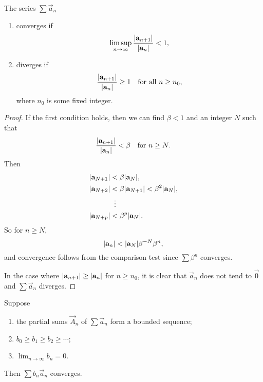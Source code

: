 \begin{thm}
  The series $\sum\vec{a}_n$
  \begin{enumerate}
  \item converges if
    \begin{equation*}
      \limsup_{n\to\infty}\frac{\lvert{\mathbf{a}_{n+1}}\rvert}
      {\lvert{\mathbf{a}_n}\rvert} < 1,
    \end{equation*}
  \item diverges if
    \begin{equation*}
      \frac{\lvert{\mathbf{a}_{n+1}}\rvert}{\lvert{\mathbf{a}_n}\rvert}\geq1
      \quad\text{for all $n\geq n_0$},
    \end{equation*}
    where $n_0$ is some fixed integer.
  \end{enumerate}
\end{thm}
\begin{proof}
  If the first condition holds, then we can find $\beta<1$ and an
  integer $N$ such that
  \begin{equation*}
    \frac{\lvert{\mathbf{a}_{n+1}}\rvert}{\lvert{\mathbf{a}_n}\rvert}<\beta
    \quad\text{for $n\geq N$}.
  \end{equation*}
  Then
  \begin{align*}
    \lvert{\mathbf{a}_{N+1}}\rvert &< \beta\lvert{\mathbf{a}_N}\rvert, \\
    \lvert{\mathbf{a}_{N+2}}\rvert &< \beta\lvert{\mathbf{a}_{N+1}}\rvert < \beta^2\lvert{\mathbf{a}_N}\rvert, \\
                        &\;\;\vdots \\
    \lvert{\mathbf{a}_{N+p}}\rvert &< \beta^p\lvert{\mathbf{a}_N}\rvert.
  \end{align*}
  So for $n\geq N$,
  \begin{equation*}
    \lvert{\mathbf{a}_n}\rvert < \lvert{\mathbf{a}_N}\rvert\beta^{-N}\beta^n,
  \end{equation*}
  and convergence follows from the comparison test since $\sum\beta^n$
  converges.

  In the case where $\lvert{\mathbf{a}_{n+1}}\rvert\geq\lvert{\mathbf{a}_n}\rvert$ for
  $n\geq n_0$, it is clear that $\vec{a}_n$ does not tend to $\vec0$
  and $\sum\vec{a}_n$ diverges.
\end{proof}
\begin{thm}
  Suppose
  \begin{enumerate}
  \item the partial sums $\vec{A}_n$ of $\sum\vec{a}_n$ form a bounded
    sequence;
  \item $b_0\geq b_1\geq b_2\geq\cdots$;
  \item $\displaystyle\lim_{n\to\infty}b_n = 0$.
  \end{enumerate}
  Then $\sum b_n\vec{a}_n$ converges.
\end{thm}
